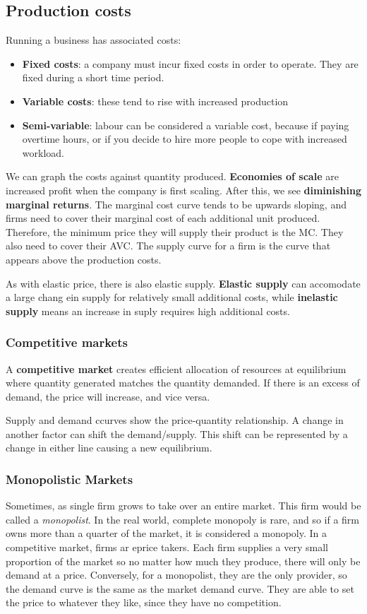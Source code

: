 \documentclass[11pt,a4paper,titlepage,dvipsnames,cmyk]{scrartcl}
\begin{document}
\subsection{Production costs}
Running a business has associated costs:
\begin{itemize}
    \item \textbf{Fixed costs}: a company must incur fixed costs in order to operate. They are fixed during a short time period.
    \item \textbf{Variable costs}: these tend to rise with increased production
    \item \textbf{Semi-variable}: labour can be considered a variable cost, because if paying overtime hours, or if you decide to hire more people to cope with increased workload.
\end{itemize}

We can graph the costs against quantity produced. \textbf{Economies of scale} are increased profit when the company is first scaling. After this, we see \textbf{diminishing marginal returns}. The marginal cost curve tends to be upwards sloping, and firms need to cover their marginal cost of each additional unit produced. Therefore, the minimum price they will supply their product is the MC. They also need to cover their AVC. The supply curve for a firm is the curve that appears above the production costs.

As with elastic price, there is also elastic supply. \textbf{Elastic supply} can accomodate a large chang ein supply for relatively small additional costs, while \textbf{inelastic supply} means an increase in suply requires high additional costs.

\subsubsection{Competitive markets}
A \textbf{competitive market} creates efficient allocation of resources at equilibrium where quantity generated matches the quantity demanded. If there is an excess of demand, the price will increase, and vice versa.

Supply and demand ccurves show the price-quantity relationship. A change in another factor can shift the demand/supply. This shift can be represented by a change in either line causing a new equilibrium.

\subsubsection{Monopolistic Markets}
Sometimes, as single firm grows to take over an entire market. This firm would be called a \textit{monopolist}. In the real world, complete monopoly is rare, and so if a firm owns more than a quarter of the market, it is considered a monopoly. In a competitive market, firms ar eprice takers. Each firm supplies a very small proportion of the market so no matter how much they produce, there will only be demand at a price. Conversely, for a monopolist, they are the only provider, so the demand curve is the same as the market demand curve. They are able to set the price to whatever they like, since they have no competition.
\end{document}
